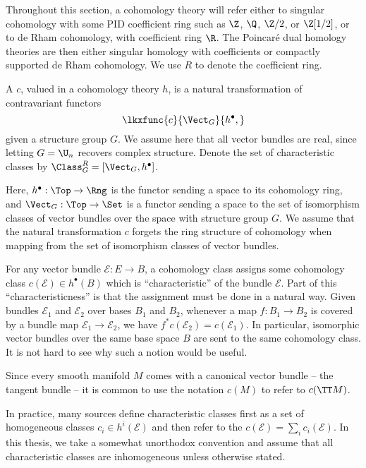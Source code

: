 Throughout this section, a cohomology theory will refer either to singular cohomology with some PID coefficient ring such as $\Z$, $\Q$, $\Z/2$, or $\Z[1/2]$, or to de Rham cohomology, with coefficient ring $\R$. The Poincar\'e dual homology theories are then either singular homology with coefficients or compactly supported de Rham cohomology. We use $R$ to denote the coefficient ring.

\begin{definition}\label{defn:characteristic-class}
	A  $c$, valued in a cohomology theory $h$, is a natural transformation of contravariant functors
	\[
		\lkxfunc{c}{\Vect_G}{h^\bullet,}
	\]
	given a structure group $G$. We assume here that all vector bundles are real, since letting $G=\U_n$ recovers complex structure. Denote the set of characteristic classes by $\Class_G^R = [\Vect_G , h^\bullet]$.
\end{definition}

Here, $h^\bullet : \Top \to \Rng$ is the functor sending a space to its  cohomology ring, and $\Vect_G : \Top \to \Set$ is a functor sending a space to the set of isomorphism classes of vector bundles over the space with structure group $G$. We assume that the natural transformation $c$ forgets the ring structure of cohomology when mapping from the set of isomorphism classes of vector bundles.

For any vector bundle $\mathcal{E} : E \to B$, a cohomology class assigns some cohomology class $c(\mathcal{E})\in h^\bullet(B)$ which is ``characteristic'' of the bundle $\mathcal{E}$.
Part of this ``characteristicness'' is that the assignment must be done in a natural way. Given bundles $\mathcal{E}_1$ and $\mathcal{E}_2$ over bases $B_1$ and $B_2$, whenever a map $f : B_1 \to B_2$ is covered by a bundle map $\mathcal{E}_1 \to \mathcal{E}_2$, we have $f^* c(\mathcal{E}_2) = c(\mathcal{E}_1)$. In particular, isomorphic vector bundles over the same base space $B$ are sent to the same cohomology class. It is not hard to see why such a notion would be useful.

\begin{convention*}
	Since every smooth manifold $M$ comes with a canonical vector bundle -- the tangent bundle -- it is common to use the notation $c(M)$ to refer to $c(\TT M)$.
\end{convention*}

\begin{remark}
	In practice, many sources define characteristic classes first as a set of homogeneous classes $c_i\in h^i(\mathcal{E})$ and then refer to the  $c(\mathcal{E})=\sum_i c_i(\mathcal{E})$. In this thesis, we take a somewhat unorthodox convention and assume that all characteristic classes are inhomogeneous unless otherwise stated.
\end{remark}

